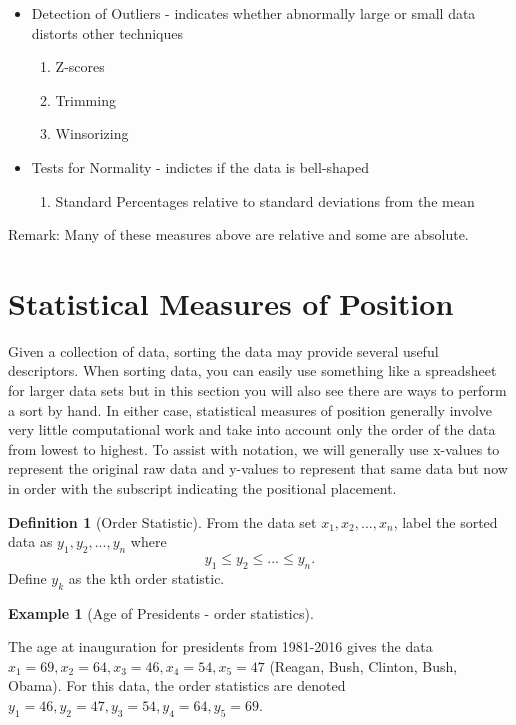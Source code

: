 \documentclass[10pt,]{book}
\theoremstyle{plain}
\theoremstyle{definition}
\newtheorem{definition}[theorem]{Definition}
\theoremstyle{definition}
\newtheorem{example}[theorem]{Example}
\theoremstyle{definition}
\numberwithin{equation}{section}
\begin{document}
\begin{itemize}[label=\textbullet]
\begin{itemize}[label=$\circ$]
\begin{enumerate}
\item\hypertarget{li-26}{}Coefficient of Kurtosis%
\end{enumerate}
\item{}Detection of Outliers 
			- indicates whether abnormally large or small data distorts other 
			techniques%
%
\begin{enumerate}
\item\hypertarget{li-28}{}Z-scores%
\item\hypertarget{li-29}{}Trimming%
\item\hypertarget{li-30}{}Winsorizing%
\end{enumerate}
\item{}Tests for Normality 
			- indictes if the data is bell-shaped%
%
\begin{enumerate}
\item\hypertarget{li-32}{}Standard Percentages relative to standard deviations from the mean%
\end{enumerate}
\end{itemize}
\end{itemize}
\par
Remark: Many of these measures above are relative and some are absolute.%
\typeout{************************************************}
\typeout{************************************************}
\section[{Statistical Measures of Position}]{Statistical Measures of Position}\label{section-3}
Given a collection of data, sorting the data may provide several useful descriptors. When sorting data, you can easily use something like a spreadsheet for larger data sets but in this section you will also see there are ways to perform a sort by hand. In either case, statistical measures of position generally involve very little computational work and take into account only the order of the data from lowest to highest.  To assist with notation, we will generally use x-values to represent the original raw data and y-values to represent that same data but now in order with the subscript indicating the positional placement.
\begin{definition}[{Order Statistic}]\label{definition-1}
From the data set \(x_1, x_2, ... , x_n\), label the sorted data as \(y_1, y_2, ..., y_n\) where  
	\begin{equation*} y_1 \le y_2 \le ... \le y_n.\end{equation*} 
	Define \(y_k\) as the kth order statistic. %
\end{definition}
\begin{example}[Age of Presidents - order statistics]\label{example-1}

	The age at inauguration for presidents from 1981-2016 gives the data \(x_1 = 69, x_2 = 64, x_3 = 46, x_4 = 54, x_5 = 47\) (Reagan, Bush, Clinton, Bush, Obama). For this data, the order statistics are denoted \(y_1 = 46, y_2 = 47, y_3 = 54, y_4 = 64, y_5 = 69\).
\end{example}
\par
\end{document}
